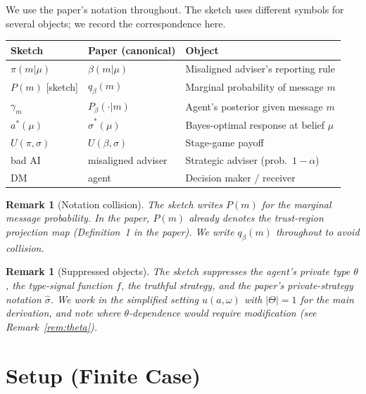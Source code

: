 \documentclass[12pt]{article}
\newtheorem{remark}[theorem]{Remark}
\begin{document}
We use the paper's notation throughout. The sketch uses different symbols for several objects; we record the correspondence here.

\medskip
\begin{center}
\begin{tabular}{lll}
\hline
\textbf{Sketch} & \textbf{Paper (canonical)} & \textbf{Object} \\
\hline
$\pi(m|\mu)$ & $\beta(m|\mu)$ & Misaligned adviser's reporting rule \\
$P(m)$ [sketch] & $q_\beta(m)$ & Marginal probability of message $m$ \\
$\gamma_m$ & $P_\beta(\cdot|m)$ & Agent's posterior given message $m$ \\
$a^*(\mu)$ & $\hat\sigma^*(\mu)$ & Bayes-optimal response at belief $\mu$ \\
$U(\pi, \sigma)$ & $U(\beta, \sigma)$ & Stage-game payoff \\
bad AI & misaligned adviser & Strategic adviser (prob.\ $1-\alpha$) \\
DM & agent & Decision maker / receiver \\
\hline
\end{tabular}
\end{center}

\begin{remark}[Notation collision]
The sketch writes $P(m)$ for the marginal message probability. In the paper, $P(m)$ already denotes the trust-region projection map (Definition~1 in the paper). We write $q_\beta(m)$ throughout to avoid collision.
\end{remark}

\begin{remark}[Suppressed objects]
The sketch suppresses the agent's private type $\theta$, the type-signal function $f$, the truthful strategy, and the paper's private-strategy notation $\hat\sigma$. We work in the simplified setting $u(a,\omega)$ with $|\Theta|=1$ for the main derivation, and note where $\theta$-dependence would require modification (see Remark~\ref{rem:theta}).
\end{remark}

\section{Setup (Finite Case)}
\label{sec:setup}
\end{document}

